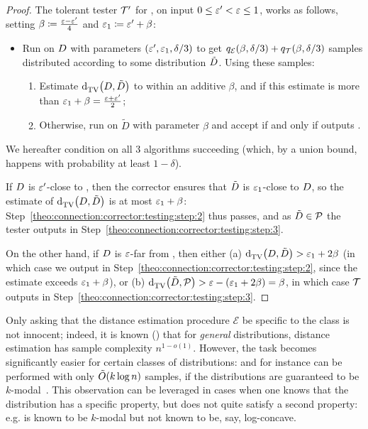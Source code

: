 \begin{proof}
The tolerant tester $\mathcal{T}^\prime$ for \property, on input $0 \leq \varepsilon^\prime < \varepsilon \leq 1$, works as follows, setting $\beta\coloneqq\frac{\varepsilon-\varepsilon^\prime}{4}$ and $\varepsilon_1\coloneqq \varepsilon^\prime+\beta$:
\begin{itemize}[-]
  \item\label{theo:connection:corrector:testing:step:1} Run \Algo on $D$ with parameters $(\varepsilon^\prime,\varepsilon_1,\delta/3)$ to get $q_{\mathcal{E}}(\beta,\delta/3)+q_\mathcal{T}(\beta,\delta/3)$ samples distributed according to some distribution $\tilde{D}$. Using these samples:
    \begin{enumerate}
        \item\label{theo:connection:corrector:testing:step:2} Estimate ${\operatorname{d}_{\textrm{TV}}^{}\!\left({D, \tilde{D}}\right)}$ to within an additive $\beta$, and \reject if this estimate is more than $\varepsilon_1+\beta=\frac{\varepsilon+\varepsilon^\prime}{2}$;
        \item\label{theo:connection:corrector:testing:step:3} Otherwise, run \Tester on $\tilde{D}$ with parameter $\beta$ and accept if and only if \Tester outputs \accept.
    \end{enumerate}
\end{itemize}

We hereafter condition on all 3 algorithms succeeding (which, by a union bound, happens with probability at least $1-\delta$).

\noindent If $D$ is $\varepsilon^\prime$-close to \property, then the corrector ensures that $\tilde{D}$ is $\varepsilon_1$-close to $D$, so the estimate of ${\operatorname{d}_{\textrm{TV}}^{}\!\left({D, \tilde{D}}\right)}$ is at most $\varepsilon_1+\beta$: Step~\ref{theo:connection:corrector:testing:step:2} thus passes, and as $\tilde{D}\in\mathcal{P}$ the tester outputs \accept in Step~\ref{theo:connection:corrector:testing:step:3}.\medskip

\noindent On the other hand, if $D$ is $\varepsilon$-far from \property, then either \textsf{(a)} ${\operatorname{d}_{\textrm{TV}}^{}\!\left({D, \tilde{D}}\right)} > \varepsilon_1+2\beta$ (in which case we output \reject in Step~\ref{theo:connection:corrector:testing:step:2}, since the estimate exceeds $\varepsilon_1+\beta$), or \textsf{(b)} ${\operatorname{d}_{\textrm{TV}}^{}\!\left({\tilde{D}, \mathcal{P}}\right)} > \varepsilon - (\varepsilon_1+2\beta) = \beta$, in which case $\mathcal{T}$ outputs \reject in Step~\ref{theo:connection:corrector:testing:step:3}.
\end{proof}

\begin{remark}\label{remark:distance:estimation}
Only asking that the distance estimation procedure $\mathcal{E}$ be specific to the class \class is not innocent; indeed, it is known (\cite{ValiantValiant:11}) that for \emph{general} distributions, distance estimation has sample complexity $n^{1-o(1)}$. However, the task becomes significantly easier for certain classes of distributions: and for instance can be performed with only $\tildeO{k\log n}$ samples, if the distributions are guaranteed to be $k$-modal~\cite{DDSVV:13}. This observation can be leveraged in cases
when one knows that the distribution has a specific property, but does not quite satisfy a second property: e.g. is known to be $k$-modal but not known to be, say, log-concave.
\end{remark}

